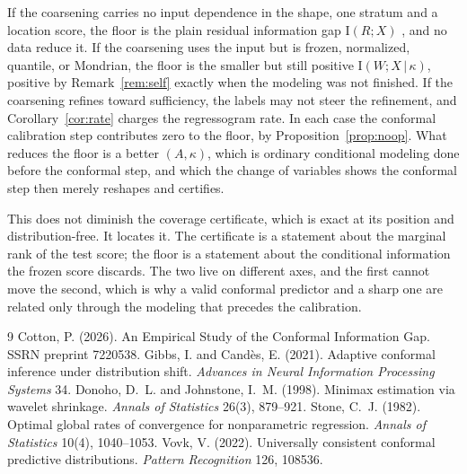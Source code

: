 \documentclass[11pt]{article}
\theoremstyle{definition}
\theoremstyle{remark}
\newcommand{\I}{\mathrm{I}}
\newcommand{\given}{\,|\,}
\begin{document}
If the coarsening carries no input dependence in the shape, one stratum and a location
score, the floor is the plain residual information gap $\I(R;X)$
\citep{cotton2026gap}, and no data reduce it. If the coarsening uses the input but is
frozen, normalized, quantile, or Mondrian, the floor is the smaller but still positive
$\I(W;X\given\kappa)$, positive by Remark~\ref{rem:self} exactly when the modeling was
not finished. If the coarsening refines toward sufficiency, the labels may not steer the
refinement, and Corollary~\ref{cor:rate} charges the regressogram rate. In each case the
conformal calibration step contributes zero to the floor, by
Proposition~\ref{prop:noop}. What reduces the floor is a better $(A,\kappa)$, which is
ordinary conditional modeling done before the conformal step, and which the change of
variables shows the conformal step then merely reshapes and certifies.

This does not diminish the coverage certificate, which is exact at its position and
distribution-free. It locates it. The certificate is a statement about the marginal
rank of the test score; the floor is a statement about the conditional information the
frozen score discards. The two live on different axes, and the first cannot move the
second, which is why a valid conformal predictor and a sharp one are related only
through the modeling that precedes the calibration.


\begin{thebibliography}{9}
 Cotton, P. (2026). An Empirical Study of the
  Conformal Information Gap. SSRN preprint 7220538.
 Gibbs, I. and Cand\`es, E.
  (2021). Adaptive conformal inference under distribution shift. \emph{Advances in
  Neural Information Processing Systems} 34.
 Donoho, D.~L. and Johnstone,
  I.~M. (1998). Minimax estimation via wavelet shrinkage. \emph{Annals of Statistics}
  26(3), 879--921.
 Stone, C.~J. (1982). Optimal global rates of
  convergence for nonparametric regression. \emph{Annals of Statistics} 10(4),
  1040--1053.
 Vovk, V. (2022). Universally consistent
  conformal predictive distributions. \emph{Pattern Recognition} 126, 108536.
\end{thebibliography}
\end{document}
